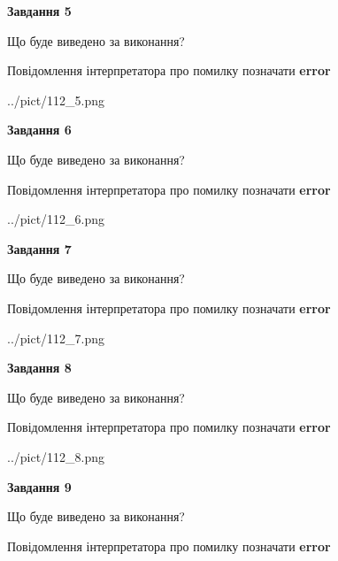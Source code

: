 \documentclass[11pt, ukrainian]{article}
\begin{document}
{\begin {large}
{\begin {center}\textbf{Завдання 5}\end {center}}\par
Що буде виведено за виконання? \par
Повідомлення інтерпретатора про помилку позначати \textbf{error}

\begin{center}
	{../pict/112_5.png}
\end{center}
\newpage

{\begin {center}\textbf{Завдання 6}\end {center}}\par
Що буде виведено за виконання? \par
Повідомлення інтерпретатора про помилку позначати \textbf{error}

\begin{center}
	{../pict/112_6.png}
\end{center}
\newpage

{\begin {center}\textbf{Завдання 7}\end {center}}\par
Що буде виведено за виконання? \par
Повідомлення інтерпретатора про помилку позначати \textbf{error}

\begin{center}
	{../pict/112_7.png}
\end{center}
\newpage

{\begin {center}\textbf{Завдання 8}\end {center}}\par
Що буде виведено за виконання? \par
Повідомлення інтерпретатора про помилку позначати \textbf{error}

\begin{center}
	{../pict/112_8.png}
\end{center}
\newpage

{\begin {center}\textbf{Завдання 9}\end {center}}\par
Що буде виведено за виконання? \par
Повідомлення інтерпретатора про помилку позначати \textbf{error}


\end{large}}
\end{document}
